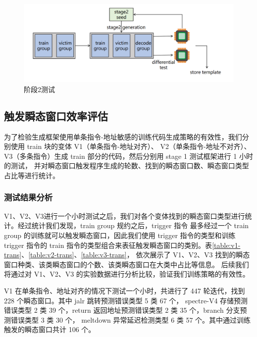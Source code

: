 \begin{figure}[!h]
    \centering
    \includegraphics[width=\linewidth]{figure/paper/stage2-test.png}
    \caption{阶段2测试}
    \label{paper:stage2-test}
\end{figure}

\subsection{触发瞬态窗口效率评估}

为了检验生成框架使用单条指令-地址敏感的训练代码生成策略的有效性，我们分别使用 train 块的变体 V1（单条指令-地址对齐）、
V2（单条指令-地址不对齐）、V3（多条指令）生成 train 部分的代码，然后分别用 stage 1 测试框架进行 1 小时的测试，
并对瞬态窗口触发程序生成的轮数、找到的瞬态窗口数、瞬态窗口类型占比等进行统计。\par

\subsubsection{测试结果分析}

V1、V2、V3进行一个小时测试之后，我们对各个变体找到的瞬态窗口类型进行统计。经过统计我们发现，train group 规约之后，trigger 指令
最多经过一个 train group 的训练就可以触发瞬态窗口，因此我们使用 trigger 指令的类型和训练 trigger 指令的
train 指令的类型组合来表征触发瞬态窗口的类别。表\ref{table:v1-trans}、\ref{table:v2-trans}、\ref{table:v3-trans}，
依次展示了 V1、V2、V3 找到的瞬态窗口种类、该类瞬态窗口的个数、该类瞬态窗口在大类中占比等信息。
后续我们将通过对 V1、V2、V3 的实验数据进行分析比较，验证我们训练策略的有效性。\par

V1 在单条指令、地址对齐的情况下测试一个小时，共进行了 447 轮迭代，找到 228 个瞬态窗口。其中 jalr 跳转预测错误类型 5 类 67 个，
spectre-V4 存储预测错误类型 2 类 39 个，return 返回地址预测错误类型 2 类 35 个，branch 分支预测错误类型 3 类 30 个，
meltdown 异常延迟检测类型 6 类 57 个。其中通过训练触发的瞬态窗口共计 106 个。\par

